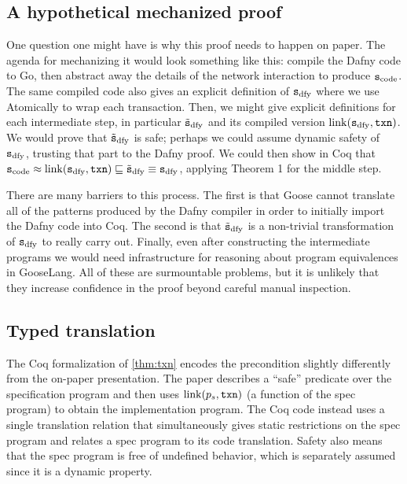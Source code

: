 \subsection{A hypothetical mechanized proof}

One question one might have is why this proof needs to happen on paper. The
agenda for mechanizing it would look something like this: compile the Dafny code
to Go, then abstract away the details of the network interaction to produce
$\texttt{s}_{\mathrm{code}}$. The same compiled code also gives an explicit
definition of $\texttt{s}_{\mathrm{dfy}}$ where we use Atomically to wrap each transaction. Then, we
might give explicit definitions for each intermediate step, in particular
$\tilde{\texttt{s}}_{\mathrm{dfy}}$ and its compiled version $\mathrm{link}(\texttt{s}_{\mathrm{dfy}}, \texttt{txn})$. We would prove that
$\tilde{\texttt{s}}_{\mathrm{dfy}}$ is safe; perhaps we could assume dynamic safety of $\texttt{s}_{\mathrm{dfy}}$, trusting
that part to the Dafny proof. We could then show in Coq that
$\texttt{s}_{\mathrm{code}} \approx \mathrm{link}(\texttt{s}_{\mathrm{dfy}}, \texttt{txn}) \sqsubseteq \tilde{\texttt{s}}_{\mathrm{dfy}} \equiv \texttt{s}_{\mathrm{dfy}}$,
applying Theorem 1 for the middle step.

There are many barriers to this process. The first is that Goose cannot
translate all of the patterns produced by the Dafny compiler in order to
initially import the Dafny code into Coq. The second is that $\tilde{\texttt{s}}_{\mathrm{dfy}}$ is a
non-trivial transformation of $\texttt{s}_{\mathrm{dfy}}$ to really carry out. Finally, even after
constructing the intermediate programs we would need infrastructure for
reasoning about program equivalences in GooseLang. All of these are surmountable
problems, but it is unlikely that they increase confidence in the proof beyond
careful manual inspection.

\subsection{Typed translation}


The Coq formalization of \autoref{thm:txn} encodes the precondition slightly
differently from the on-paper presentation. The paper describes a ``safe''
predicate over the specification program and then uses
$\mathrm{link}(p_{s}, \texttt{txn})$ (a function of the spec program) to obtain the
implementation program. The Coq code instead uses a single translation relation
that simultaneously gives static restrictions on the spec program and relates a
spec program to its code translation. Safety also means that the spec program is
free of undefined behavior, which is separately assumed since it is a dynamic
property.

